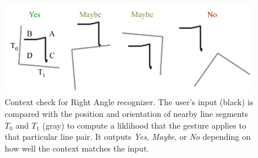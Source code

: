 \begin{figure}
  \centering
  \includegraphics[width=0.9\linewidth]{img/right-angle.pdf}
  \caption[Right Angle]{Context check for Right Angle recognizer. The
    user's input (black) is compared with the position and orientation
    of nearby line segments $T_0$ and $T_1$ (gray) to compute a
    liklihood that the gesture applies to that particular line
    pair. It outputs \textit{Yes}, \textit{Maybe}, or \textit{No}
    depending on how well the context matches the input.}
  \label{fig:right-angle}
\end{figure}
